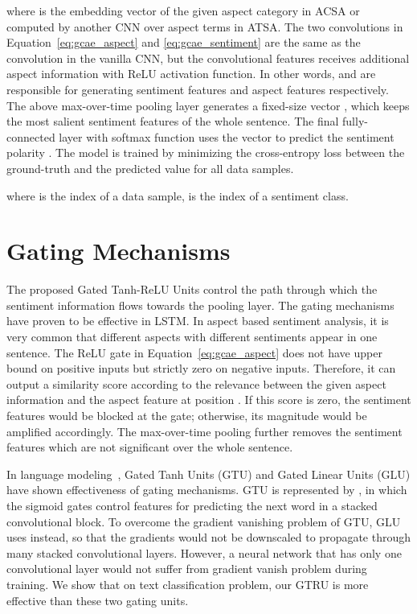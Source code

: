 \documentclass[11pt,a4paper]{article}
\begin{document}
where  is the embedding vector of the given aspect category in ACSA or computed by another CNN over aspect terms in ATSA. 
The two convolutions in Equation~\ref{eq:gcae_aspect} and \ref{eq:gcae_sentiment} are the same as the convolution in the vanilla CNN, but the convolutional features  receives additional aspect information  with ReLU activation function. In other words,  and  are responsible for generating sentiment features and aspect features respectively.  
The above max-over-time pooling layer generates a fixed-size vector , which keeps the most salient sentiment features of the whole sentence. 
The final fully-connected layer with softmax function uses the vector  to predict the sentiment polarity . The model is trained by minimizing the cross-entropy loss between the ground-truth  and the predicted value  for all data samples.

where  is the index of a data sample,  is the index of a sentiment class.


\section{Gating Mechanisms}
The proposed Gated Tanh-ReLU Units control the path through which the sentiment information flows towards the pooling layer. The gating mechanisms have proven to be effective in LSTM.
In aspect based sentiment analysis, it is very common that different aspects with different sentiments appear in one sentence. The ReLU gate in Equation~\ref{eq:gcae_aspect} does not have upper bound on positive inputs but strictly zero on negative inputs. Therefore, it can output a similarity score according to the relevance between the given aspect information  and the aspect feature  at position . If this score is zero, the sentiment features  would be blocked at the gate; otherwise, its magnitude would be amplified accordingly. The max-over-time pooling further removes the sentiment features which are not significant over the whole sentence.

In language modeling~\cite{Dauphin:2016uja,Kalchbrenner:2016vf,vandenOord:2016tk,Gehring:2017tv}, Gated Tanh Units (GTU) and Gated Linear Units (GLU) have shown effectiveness of gating mechanisms. 
GTU is represented by , in which the sigmoid gates control features for predicting the next word in a stacked convolutional block. 
To overcome the gradient vanishing problem of GTU, GLU uses  instead, so that the gradients would not be downscaled to propagate through many stacked convolutional layers. 
However, a neural network that has only one convolutional layer would not suffer from gradient vanish problem during training.
We show that on text classification problem, our GTRU is more effective than these two gating units. 
\end{document}
